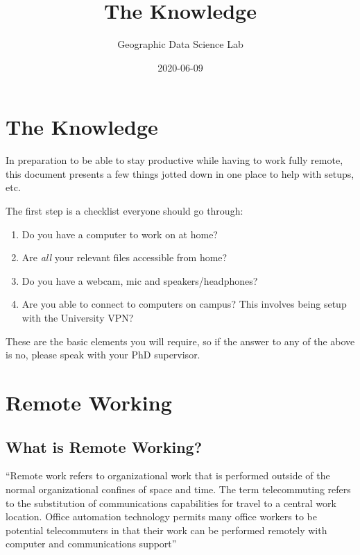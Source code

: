 \documentclass[
]{book}
\title{The Knowledge}
\author{Geographic Data Science Lab}
\date{2020-06-09}
\providecommand{\tightlist}{%
  \setlength{\itemsep}{0pt}\setlength{\parskip}{0pt}}
\begin{document}
\maketitle

{
\setcounter{tocdepth}{1}
\tableofcontents
}
\hypertarget{the-knowledge}{%
\chapter{The Knowledge}\label{the-knowledge}}

In preparation to be able to stay productive while having to work fully remote, this document presents a few things jotted down in one place to help with setups, etc.

The first step is a checklist everyone should go through:

\begin{enumerate}
\def\labelenumi{\arabic{enumi}.}
\tightlist
\item
  Do you have a computer to work on at home?
\item
  Are \emph{all} your relevant files accessible from home?
\item
  Do you have a webcam, mic and speakers/headphones?
\item
  Are you able to connect to computers on campus? This involves being setup with the University VPN?
\end{enumerate}

These are the basic elements you will require, so if the answer to any of the above is no, please speak with your PhD supervisor.

\hypertarget{remote-working}{%
\chapter{Remote Working}\label{remote-working}}

\hypertarget{what-is-remote-working}{%
\section{What is Remote Working?}\label{what-is-remote-working}}

``Remote work refers to organizational work that is performed outside of the normal organizational confines of space and time. The term telecommuting refers to the substitution of communications capabilities for travel to a central work location. Office automation technology permits many office workers to be potential telecommuters in that their work can be performed remotely with computer and communications support'' \citep{olson1983remote}
\end{document}
